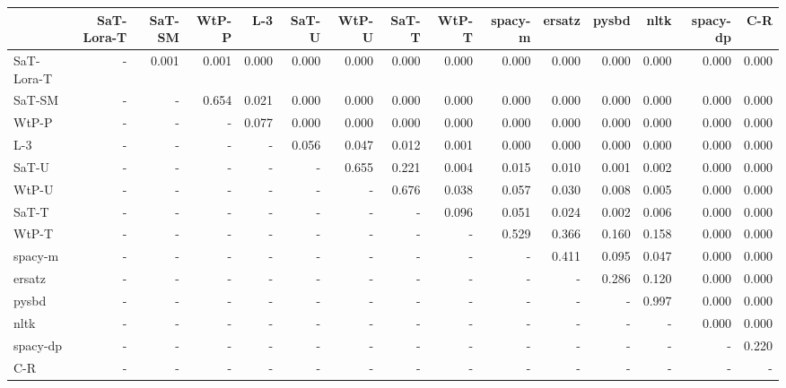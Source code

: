\begin{tabular}{lrrrrrrrrrrrrrr}
\toprule
 & SaT-Lora-T & SaT-SM & WtP-P & L-3 & SaT-U & WtP-U & SaT-T & WtP-T & spacy-m & ersatz & pysbd & nltk & spacy-dp & C-R \\
\midrule
SaT-Lora-T & - & 0.001 & 0.001 & 0.000 & 0.000 & 0.000 & 0.000 & 0.000 & 0.000 & 0.000 & 0.000 & 0.000 & 0.000 & 0.000 \\
SaT-SM & - & - & 0.654 & 0.021 & 0.000 & 0.000 & 0.000 & 0.000 & 0.000 & 0.000 & 0.000 & 0.000 & 0.000 & 0.000 \\
WtP-P & - & - & - & 0.077 & 0.000 & 0.000 & 0.000 & 0.000 & 0.000 & 0.000 & 0.000 & 0.000 & 0.000 & 0.000 \\
L-3 & - & - & - & - & 0.056 & 0.047 & 0.012 & 0.001 & 0.000 & 0.000 & 0.000 & 0.000 & 0.000 & 0.000 \\
SaT-U & - & - & - & - & - & 0.655 & 0.221 & 0.004 & 0.015 & 0.010 & 0.001 & 0.002 & 0.000 & 0.000 \\
WtP-U & - & - & - & - & - & - & 0.676 & 0.038 & 0.057 & 0.030 & 0.008 & 0.005 & 0.000 & 0.000 \\
SaT-T & - & - & - & - & - & - & - & 0.096 & 0.051 & 0.024 & 0.002 & 0.006 & 0.000 & 0.000 \\
WtP-T & - & - & - & - & - & - & - & - & 0.529 & 0.366 & 0.160 & 0.158 & 0.000 & 0.000 \\
spacy-m & - & - & - & - & - & - & - & - & - & 0.411 & 0.095 & 0.047 & 0.000 & 0.000 \\
ersatz & - & - & - & - & - & - & - & - & - & - & 0.286 & 0.120 & 0.000 & 0.000 \\
pysbd & - & - & - & - & - & - & - & - & - & - & - & 0.997 & 0.000 & 0.000 \\
nltk & - & - & - & - & - & - & - & - & - & - & - & - & 0.000 & 0.000 \\
spacy-dp & - & - & - & - & - & - & - & - & - & - & - & - & - & 0.220 \\
C-R & - & - & - & - & - & - & - & - & - & - & - & - & - & - \\
\bottomrule
\end{tabular}

